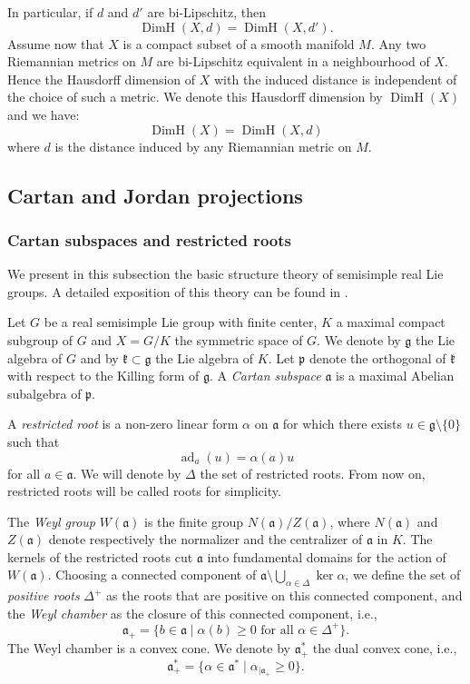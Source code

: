\documentclass[11pt]{article}
\newcommand{\ie}{i.e.,\xspace}
\newcommand{\Subsection}{\subsection}
\numberwithin{equation}{section}
\theoremstyle{definition}
\newcommand{\fa}{\mathfrak{a}}
\newcommand{\frakg}{\mathfrak{g}}
\newcommand{\fp}{\mathfrak{p}}
\newcommand{\fk}{\mathfrak{k}}
\DeclareMathOperator{\DimH}{DimH}
\DeclareMathOperator{\ad}{ad}
\begin{document}
In particular, if $d$ and $d'$ are bi-Lipschitz, then \[\DimH(X,d) = \DimH(X,d').\]
Assume now that $X$ is a compact subset of a smooth manifold $M$. Any two Riemannian metrics on $M$ are bi-Lipschitz equivalent in a neighbourhood of $X$. Hence the Hausdorff dimension of $X$ with the induced distance is independent of the choice of such a metric. We denote this Hausdorff dimension by $\DimH(X)$ and we have:
\[\DimH(X)= \DimH(X,d)\]
where $d$ is the distance induced by any Riemannian metric on $M$.

\Subsection{Cartan and Jordan projections} \label{subsec - lie theory}

\subsubsection{Cartan subspaces and restricted roots}
We present in this subsection the basic structure theory of semisimple real Lie groups. A detailed exposition of this theory can be found in \cite{eberlein1996geometry}.

Let $G$ be a real semisimple Lie group with finite center, $K$ a maximal compact subgroup of $G$ and $X=G/K$ the symmetric space of $G$. We denote by $\frakg$ the Lie algebra of $G$ and by $\fk\subset \frakg$ the Lie algebra of $K$. Let $\fp$ denote the orthogonal of $\fk$ with respect to the Killing form of $\frakg$. A \emph{Cartan subspace} $\fa$ is a maximal Abelian subalgebra of $\fp$.

A \emph{restricted root} is a non-zero linear form $\alpha$ on $\fa$ for which there exists $u\in \frakg \setminus \{0\}$ such that
\[\ad_a(u) = \alpha(a) u\]
for all $a\in \fa$. We will denote by $\Delta$ the set of restricted roots. From now on, restricted roots will be called roots for simplicity.

The \emph{Weyl group} $W(\fa)$ is the finite group $N(\fa)/Z(\fa)$, where $N(\fa)$ and $Z(\fa)$ denote respectively the normalizer and the centralizer of $\fa$ in $K$. The kernels of the restricted roots cut $\fa$ into fundamental domains for the action of $W(\fa)$. Choosing a connected component of $\fa \setminus \bigcup_{\alpha \in \Delta} \ker \alpha$, we define the set of \emph{positive roots} $\Delta^+$ as the roots that are positive on this connected component, and the \emph{Weyl chamber} as the closure of this connected component, \ie
\[\fa_+ = \{b\in \fa \mid \alpha(b) \geq 0 \textrm{ for all $\alpha\in \Delta^+$}\}.\]
The Weyl chamber is a convex cone. We denote by $\fa_+^*$ the dual convex cone, \ie
\[\fa_+^* = \{\alpha \in \fa^* \mid \alpha_{\vert \fa_+} \geq 0\}.\]
\end{document}
